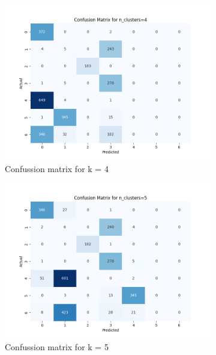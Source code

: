 \documentclass[12pt]{report}
\begin{document}
	\begin{figure}[H]
		\centering
		\begin{subfigure}{.6\textwidth}
			\centering
			\includegraphics[width=.9\linewidth]{../K-means/Output/Dataset2/confusionMatrix_k=4.png}
			\caption{Confussion matrix for k = 4}
			\label{Dataset2ConfusionMatrixk4}
		\end{subfigure}%
		\begin{subfigure}{.6\textwidth}
			\centering
			\includegraphics[width=.9\linewidth]{../K-means/Output/Dataset2/confusionMatrix_k=5.png}
			\caption{Confussion matrix for k = 5}
			\label{Dataset2ConfusionMatrixk5}
		\end{subfigure}
		\begin{subfigure}{.6\textwidth}%
			\centering

\end{subfigure}
\end{figure}
\end{document}
